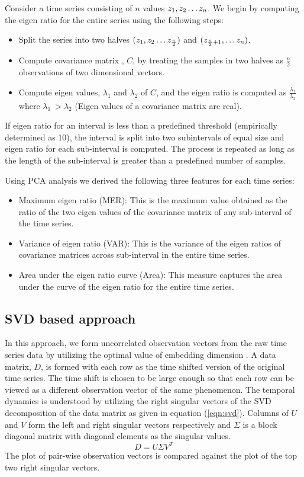 \documentclass[10pt,conference]{IEEEtran}
\begin{document}
Consider a time series consisting of $n$ values  $z_1, z_2 \mathellipsis z_n$. We begin by computing the eigen ratio for the entire series using the following steps:
\begin{itemize}
  \item  Split the series into two halves $(z_1, z_2 \mathellipsis z_{\frac{n}{2}})$ and $(z_{\frac{n}{2} + 1}, \mathellipsis z_n)$.
  \item Compute covariance matrix , $C$,  by treating the samples in two halves as $\frac{n}{2}$ observations of two dimensional vectors.
  \item Compute eigen values, $\lambda_1$ and $\lambda_2$ of $C$,  and the eigen ratio is computed as  $\frac{\lambda_1}{\lambda_2}$ where $\lambda_1 \ > \lambda_2$ (Eigen values of a covariance matrix are real).
\end{itemize}
If eigen ratio for an interval is less than a predefined threshold (empirically determined as 10), the interval is split into two subintervals of equal size and eigen ratio for each sub-interval is computed. The process is repeated as long as the length of the sub-interval is greater than a predefined number of samples.

Using PCA analysis we derived the following three features for each time series:
\begin{itemize}
  \item Maximum eigen ratio (MER): This is the maximum value obtained as the ratio of the two eigen values of the covariance matrix of any sub-interval of the time series.
  \item Variance of eigen ratio (VAR): This is the variance of the eigen ratios of covariance matrices across sub-interval in the entire time series.
  \item Area under the eigen ratio curve (Area): This measure captures the area under the curve of the eigen ratio for the entire time series.
\end{itemize}


\subsection{SVD based approach}
In this approach, we form uncorrelated observation vectors from the raw time series data by utilizing the optimal value of embedding dimension \cite{misra2006}. A data matrix, $D$, is formed with each row  as the  time shifted version of the original time series. The time shift is chosen to be large enough so that each row can be viewed as a different observation vector of the same phenomenon. The temporal dynamics is understood by utilizing the right singular vectors of the SVD decomposition of the data matrix as given in equation (\ref{eqn:svd}). Columns of $U$ and $V$  form the left and right singular vectors respectively and $\Sigma$ is a block diagonal matrix with diagonal elements as the singular values.
\begin{equation}
  D = U \Sigma V^T
  \label{eqn:svd}
\end{equation}
   The plot of pair-wise observation vectors is compared against the plot of the top two right singular vectors.
\end{document}
